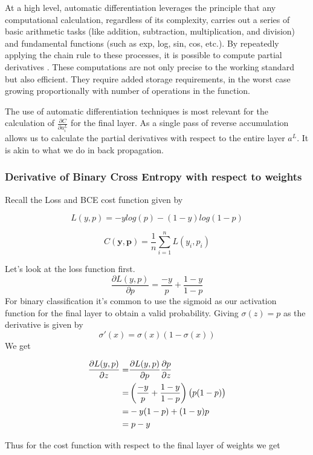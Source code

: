 \documentclass{article}
\theoremstyle{definition}
\begin{document}
At a high level, automatic differentiation leverages the principle that any computational calculation, regardless of its complexity, carries out a series of basic arithmetic tasks (like addition, subtraction, multiplication, and division) and fundamental functions (such as exp, log, sin, cos, etc.). By repeatedly applying the chain rule to these processes, it is possible to compute partial derivatives \parencite{walther2007automatic} . These computations are not only precise to the working standard but also efficient. They require added storage requirements, in the worst case growing proportionally with number of operations in the function.
\parencite{baydin2018automatic}

The use of automatic differentiation techniques is most relevant for the calculation of $\frac{\partial C}{\partial a_i^L}$ for the final layer. As a single pass of reverse accumulation  allows us to calculate the partial derivatives with respect to the entire layer $a^L$. It is akin to what we do in back propagation. 



\subsubsection{Derivative of Binary Cross Entropy with respect to weights}
Recall the Loss and BCE cost function given by

\[
L(y, p) = -ylog(p) - (1-y)log(1-p)
\]

\[
C(\mathbf{y}, \mathbf{p}) = \frac{1}{n} \sum_{i=1}^{n} L(y_i, p_i)
\]


Let's look at the loss function first.
\[
\frac{\partial L(y,p)}{\partial p} = \frac{-y}{p} + \frac{1-y}{1-p} 
\]
For binary classification it's common to use the sigmoid as our activation function for the final layer to obtain a valid probability. Giving $\sigma(z) = p$ as the derivative is given by
\[
\sigma'(x) = \sigma(x)(1-\sigma(x))
\]
We get 

\begin{align*}
\frac{\partial L(y,p)}{\partial z} =& \frac{\partial L(y,p)}{\partial p} \frac{\partial p}{\partial z} \\
=& \left(\frac{-y}{p} + \frac{1-y}{1-p}\right) \left(p(1-p)\right)\\
=& -y(1-p) + (1-y)p\\
=& \hspace{1mm} p-y 
\end{align*}

Thus for the cost function with respect to the final layer of weights we get
\end{document}
